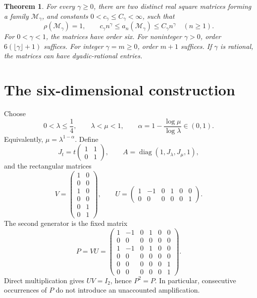 \documentclass[11pt]{article}
\newtheorem{theorem}{Theorem}
\theoremstyle{remark}\newtheorem{remark}[theorem]{Remark}
\newcommand{\diag}{\operatorname{diag}}
\newcommand{\jsr}{\rho}
\begin{document}
\begin{theorem}\label{thm:main}
For every $\gamma\geq0$, there are two distinct real square matrices forming a family $\mathcal M_\gamma$, and constants $0<c_\gamma\leq C_\gamma<\infty$, such that
\[
 \jsr(\mathcal M_\gamma)=1,\qquad
 c_\gamma n^\gamma\leq a_n(\mathcal M_\gamma)
                  \leq C_\gamma n^\gamma\quad(n\geq1).
\]
For $0<\gamma<1$, the matrices have order six. For noninteger $\gamma>0$, order $6(\lfloor\gamma\rfloor+1)$ suffices. For integer $\gamma=m\geq0$, order $m+1$ suffices. If $\gamma$ is rational, the matrices can have dyadic-rational entries.
\end{theorem}

\section{The six-dimensional construction}
Choose
\[
 0<\lambda\leq\frac14,\qquad \lambda<\mu<1,\qquad
 \alpha=1-\frac{\log\mu}{\log\lambda}\in(0,1).
\]
Equivalently, $\mu=\lambda^{1-\alpha}$. Define
\[
 J_t=t\begin{pmatrix}1&1\\0&1\end{pmatrix},\qquad
 A=\diag(1,J_\lambda,J_\mu,1),
\]
and the rectangular matrices
\[
 V=\begin{pmatrix}
 1&0\\0&0\\1&0\\0&0\\0&1\\0&1
 \end{pmatrix},\qquad
 U=\begin{pmatrix}
 1&-1&0&1&0&0\\
 0&0&0&0&0&1
 \end{pmatrix}.
\]
The second generator is the fixed matrix
\begin{equation}\label{eq:P}
 P=VU=\begin{pmatrix}
 1&-1&0&1&0&0\\
 0&0&0&0&0&0\\
 1&-1&0&1&0&0\\
 0&0&0&0&0&0\\
 0&0&0&0&0&1\\
 0&0&0&0&0&1
 \end{pmatrix}.
\end{equation}
Direct multiplication gives $UV=I_2$, hence $P^2=P$. In particular, consecutive occurrences of $P$ do not introduce an unaccounted amplification.
\end{document}
